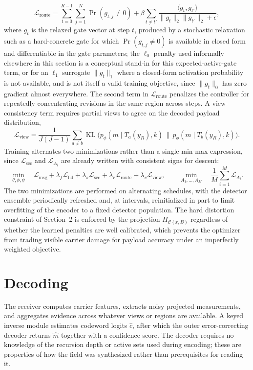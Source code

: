 \documentclass[11pt]{article}
\begin{document}
\[
\mathcal{L}_{\mathrm{route}} = \sum_{t=0}^{R-1}\sum_{j=1}^N \Pr(g_{t,j}\ne 0) + \beta \sum_{t\ne t'} \frac{\langle g_t,g_{t'}\rangle}{\|g_t\|_2\|g_{t'}\|_2+\epsilon},
\]
where $g_t$ is the relaxed gate vector at step $t$, produced by a stochastic relaxation such as a hard-concrete gate for which $\Pr(g_{t,j}\ne 0)$ is available in closed form and differentiable in the gate parameters; the $\ell_0$ penalty used informally elsewhere in this section is a conceptual stand-in for this expected-active-gate term, or for an $\ell_1$ surrogate $\|g_t\|_1$ where a closed-form activation probability is not available, and is not itself a valid training objective, since $\|g_t\|_0$ has zero gradient almost everywhere. The second term in $\mathcal{L}_{\mathrm{route}}$ penalizes the controller for repeatedly concentrating revisions in the same region across steps. A view-consistency term requires partial views to agree on the decoded payload distribution,
\[
\mathcal{L}_{\mathrm{view}} = \frac{1}{J(J-1)} \sum_{a\ne b} \operatorname{KL}\bigl(p_\phi(m\mid T_a(y_R),k)\,\|\,p_\phi(m\mid T_b(y_R),k)\bigr).
\]
Training alternates two minimizations rather than a single min-max expression, since $\mathcal{L}_{\mathrm{sec}}$ and $\mathcal{L}_{A_i}$ are already written with consistent signs for descent:
\[
\min_{\theta,\phi,\psi}\quad \mathcal{L}_{\mathrm{msg}} + \lambda_f \mathcal{L}_{\mathrm{fid}} + \lambda_s \mathcal{L}_{\mathrm{sec}} + \lambda_r \mathcal{L}_{\mathrm{route}} + \lambda_v \mathcal{L}_{\mathrm{view}},
\qquad
\min_{A_1,\dots,A_M}\quad \frac{1}{M}\sum_{i=1}^M \mathcal{L}_{A_i}.
\]
The two minimizations are performed on alternating schedules, with the detector ensemble periodically refreshed and, at intervals, reinitialized in part to limit overfitting of the encoder to a fixed detector population. The hard distortion constraint of Section~2 is enforced by the projection $\Pi_{\mathcal{C}(x,B)}$ regardless of whether the learned penalties are well calibrated, which prevents the optimizer from trading visible carrier damage for payload accuracy under an imperfectly weighted objective.

\section{Decoding}

The receiver computes carrier features, extracts noisy projected measurements, and aggregates evidence across whatever views or regions are available. A keyed inverse module estimates codeword logits $\hat c$, after which the outer error-correcting decoder returns $\hat m$ together with a confidence score. The decoder requires no knowledge of the recursion depth or active sets used during encoding; these are properties of how the field was synthesized rather than prerequisites for reading it.
\end{document}
